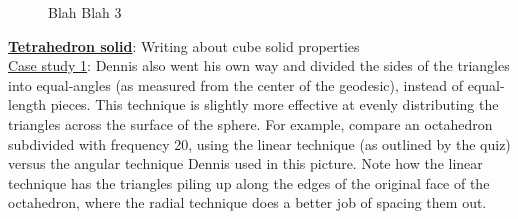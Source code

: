 \begin{center}
\begin{figure}[h]
\hfill
{}
\caption{Blah Blah 3}
\end{figure}
\end{center}
\clearpage
\newpage
\noindent\uline{\textbf{Tetrahedron solid}}:
Writing about cube solid properties\\

\noindent\uline{Case study 1}:
Dennis also went his own way and divided the sides of the triangles into equal-angles (as measured from the center of the geodesic), instead of equal-length pieces. This technique is slightly more effective at evenly distributing the triangles across the surface of the sphere. For example, compare an octahedron subdivided with frequency 20, using the linear technique (as outlined by the quiz) versus the angular technique Dennis used in this picture. Note how the linear technique has the triangles piling up along the edges of the original face of the octahedron, where the radial technique does a better job of spacing them out.\\

